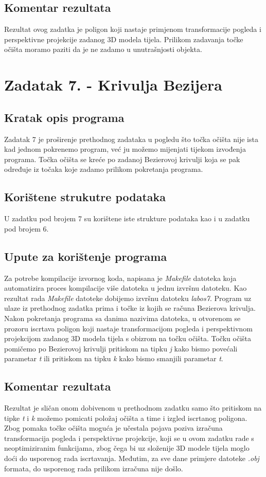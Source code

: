\documentclass[oneside]{scrbook}
\begin{document}
\subsection{Komentar rezultata}
Rezultat ovog zadatka je poligon koji nastaje primjenom transformacije pogleda i perspektivne projekcije zadanog 3D modela tijela. Prilikom zadavanja točke očišta moramo paziti da je ne zadamo u unutrašnjosti objekta.

\section{Zadatak 7. - Krivulja Bezijera}
\subsection{Kratak opis programa}
Zadatak 7 je proširenje prethodnog zadataka u pogledu što točka očišta nije ista kad jednom pokrenemo program, već ju možemo mijenjati tijekom izvođenja programa. Točka očišta se kreće po zadanoj Bezierovoj krivulji koja se pak određuje iz točaka koje zadamo prilikom pokretanja programa. 

\subsection{Korištene strukutre podataka}
U zadatku pod brojem 7 su korištene iste strukture podataka kao i u zadatku pod brojem 6.

\subsection{Upute za korištenje programa}
Za potrebe kompilacije izvornog koda, napisana je \textit{Makefile} datoteka koja automatizira proces kompilacije više datoteka u jednu izvršnu datoteku. Kao rezultat rada \textit{Makefile} datoteke dobijemo izvršnu datoteku \textit{labos7}. Program uz ulaze iz prethodnog zadatka prima i točke iz kojih se računa Bezierova krivulja. Nakon pokretanja programa sa danima nazivima datoteka, u otvorenom se prozoru iscrtava poligon koji nastaje transformacijom pogleda i perspektivnom projekcijom zadanog 3D modela tijela s obizrom na točku očišta. Točku očišta pomičemo po Bezierovoj krivulji pritiskom na tipku \textit{j} kako bismo povećali parametar \textit{t} ili pritiskom na tipku \textit{k} kako bismo smanjili parametar \textit{t}.

\subsection{Komentar rezultata}
Rezultat je sličan onom dobivenom u prethodnom zadatku samo što pritiskom na tipke \textit{t} i \textit{k} možemo pomicati položaj očišta a time i izgled iscrtanog poligona. Zbog pomaka točke očišta moguća je učestala pojava poziva izračuna transformacija pogleda i perspektivne projekcije, koji se u ovom zadatku rade s neoptimiziranim funkcijama, zbog čega bi uz složenije 3D modele tijela moglo doći do usporenog rada iscrtavanja. Međutim, za sve dane primjere datoteke \textit{.obj} formata, do usporenog rada prilikom izračuna nije došlo.
\end{document}
